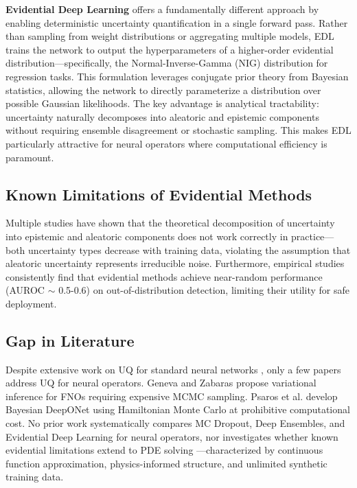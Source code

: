 \textbf{Evidential Deep Learning} \cite{sensoy2018evidential,amini2020deep} offers a fundamentally different approach by enabling deterministic uncertainty quantification in a single forward pass. Rather than sampling from weight distributions or aggregating multiple models, EDL trains the network to output the hyperparameters of a higher-order evidential distribution---specifically, the Normal-Inverse-Gamma (NIG) distribution for regression tasks. This formulation leverages conjugate prior theory from Bayesian statistics, allowing the network to directly parameterize a distribution over possible Gaussian likelihoods. The key advantage is analytical tractability: uncertainty naturally decomposes into aleatoric and epistemic components without requiring ensemble disagreement or stochastic sampling. This makes EDL particularly attractive for neural operators where computational efficiency is paramount.

\subsection{Known Limitations of Evidential Methods}

Multiple studies \cite{jurgens2024epistemic,ulmer2024prior,bickford2024rethinking} have shown that the theoretical 
decomposition of uncertainty into epistemic and aleatoric components does not work correctly in practice---both 
uncertainty types decrease with training data, violating the assumption that aleatoric uncertainty represents 
irreducible noise. Furthermore, empirical studies \cite{meinke2024uncertaintyquantification,hullermeier2021aleatoric} 
consistently find that evidential methods achieve near-random performance (AUROC $\sim$ 0.5-0.6) on 
out-of-distribution detection, limiting their utility for safe deployment.

\subsection{Gap in Literature}

Despite extensive work on UQ for standard neural networks \cite{abdar2021review}, only a few papers address UQ
for neural operators. Geneva and Zabaras \cite{geneva2022modeling} propose variational inference for FNOs requiring
expensive MCMC sampling. Psaros et al. \cite{psaros2023uncertainty} develop Bayesian DeepONet using Hamiltonian
Monte Carlo at prohibitive computational cost. No prior work systematically compares MC Dropout, Deep Ensembles,
and Evidential Deep Learning for neural operators, nor investigates whether known evidential limitations extend to
PDE solving \cite{karniadakis2021physics}---characterized by continuous function approximation, physics-informed
structure, and unlimited synthetic training data.


